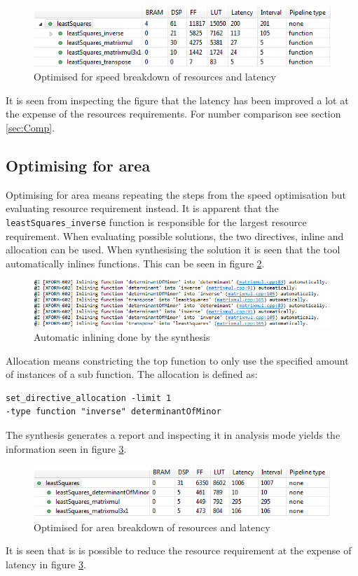 \begin{figure}[H]
\centering
\includegraphics[scale=1]{billeder/SpeedAreaLatency}
\caption{Optimised for speed breakdown of resources and latency}
\label{fig:SpeedBreak}
\end{figure}
It is seen from inspecting the figure that the latency has been improved a lot at the expense of the resources requirements. For number comparison see section \ref{sec:Comp}.
\subsection{Optimising for area}
Optimising for area means repeating the steps from the speed optimisation but evaluating resource requirement instead. It is apparent that the \texttt{leastSquares\_inverse} function is responsible for the largest resource requirement. When evaluating possible solutions, the two directives, inline and allocation can be used. When synthesising the solution it is seen that the tool automatically inlines functions. This can be seen in figure \ref{fig:areainline}.
\begin{figure}[H]
\centering
\includegraphics[width  = 1\textwidth]{billeder/inlining}
\caption{Automatic inlining done by the synthesis}
\label{fig:areainline}
\end{figure}
Allocation means constricting the top function to only use the specified amount of instances of a sub function. The allocation is defined as:
\begin{lstlisting}[caption={Allocation directive applied to the least squares inverse sub function },label=allocationdir]
set_directive_allocation -limit 1 
-type function "inverse" determinantOfMinor
\end{lstlisting}
The synthesis generates a report and inspecting it in analysis mode yields the information seen in figure \ref{fig:AreaBreak}.
\begin{figure}[H]
\centering
\includegraphics[scale=1]{billeder/AreaAreaLatency}
\caption{Optimised for area breakdown of resources and latency}
\label{fig:AreaBreak}
\end{figure}
It is seen that is is possible to reduce the resource requirement at the expense of latency in figure \ref{fig:AreaBreak}. 
